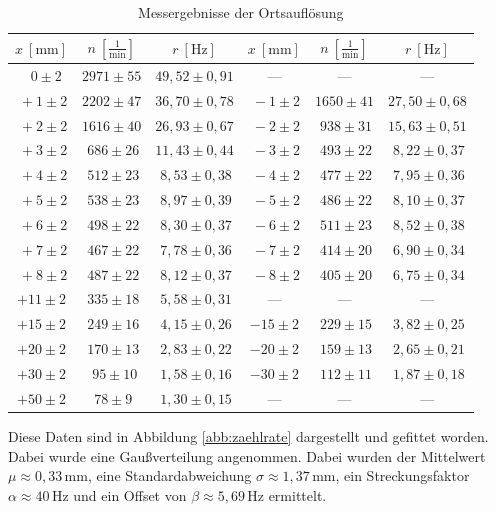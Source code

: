 \documentclass[12pt,a4paper]{scrartcl}
\numberwithin{equation}{section} %
\begin{document}
\begin{table}[h]
	\centering
	\begin{tabular}{c|c|c||c|c|c}
		$x\ [\mathrm{mm}]$ & $n\ [\frac{1}{\mathrm{min}}]$ & $r\ [\mathrm{Hz}]$ &
		$x\ [\mathrm{mm}]$ & $n\ [\frac{1}{\mathrm{min}}]$ & $r\ [\mathrm{Hz}]$ \vspace{1pt}\\
		\hline
		$\ \ \ 0 \pm 2$ & $2971 \pm 55$ & $49,52 \pm 0,91$ &---&---&--- \\
		$\ +1 \pm 2$ & $2202 \pm 47$ & $36,70 \pm 0,78$ &
		$\ -1 \pm 2$ & $1650 \pm 41$ & $27,50 \pm 0,68$ \\
		$\ +2 \pm 2$ & $1616 \pm 40$ & $26,93 \pm 0,67$ &
		$\ -2 \pm 2$ & $\ 938 \pm 31$ & $15,63 \pm 0,51$ \\
		$\ +3 \pm 2$ & $\ 686 \pm 26$ & $11,43 \pm 0,44$ &
		$\ -3 \pm 2$ & $\ 493 \pm 22$ & $\ 8,22 \pm 0,37$ \\
		$\ +4 \pm 2$ & $\ 512 \pm 23$ & $\ 8,53 \pm 0,38$ &
		$\ -4 \pm 2$ & $\ 477 \pm 22$ & $\ 7,95 \pm 0,36$ \\
		$\ +5 \pm 2$ & $\ 538 \pm 23$ & $\ 8,97 \pm 0,39$ &
		$\ -5 \pm 2$ & $\ 486 \pm 22$ & $\ 8,10 \pm 0,37$ \\
		$\ +6 \pm 2$ & $\ 498 \pm 22$ & $\ 8,30 \pm 0,37$ &
		$\ -6 \pm 2$ & $\ 511 \pm 23$ & $\ 8,52 \pm 0,38$ \\
		$\ +7 \pm 2$ & $\ 467 \pm 22$ & $\ 7,78 \pm 0,36$ &
		$\ -7 \pm 2$ & $\ 414 \pm 20$ & $\ 6,90 \pm 0,34$ \\
		$\ +8 \pm 2$ & $\ 487 \pm 22$ & $\ 8,12 \pm 0,37$ &
		$\ -8 \pm 2$ & $\ 405 \pm 20$ & $\ 6,75 \pm 0,34$ \\
		$+11 \pm 2$ & $\ 335 \pm 18$ & $\ 5,58 \pm 0,31$ &---&---&---\\
		$+15 \pm 2$ & $\ 249 \pm 16$ & $\ 4,15 \pm 0,26$ &
		$-15 \pm 2$ & $\ 229 \pm 15$ & $\ 3,82 \pm 0,25$ \\
		$+20 \pm 2$ & $\ 170 \pm 13$ & $\ 2,83 \pm 0,22$ &
		$-20 \pm 2$ & $\ 159 \pm 13$ & $\ 2,65 \pm 0,21$ \\
		$+30 \pm 2$ & $\ \ 95 \pm 10$ & $\ 1,58 \pm 0,16$ &
		$-30 \pm 2$ & $\ 112 \pm 11$ & $\ 1,87 \pm 0,18$ \\
		$+50 \pm 2$ & $\ 78 \pm 9$ & $\ 1,30 \pm 0,15$ &---&---&---
	\end{tabular}
	\caption{Messergebnisse der Ortsauflösung}
	\label{tab:Ortsauflösung}
\end{table}

\noindent
Diese Daten sind in Abbildung \ref{abb:zaehlrate} dargestellt und gefittet worden. Dabei wurde eine Gaußverteilung angenommen. Dabei wurden der Mittelwert $\mu\approx 0,33\,\mathrm{mm}$, eine Standardabweichung $\sigma\approx1,37\,\mathrm{mm}$, ein Streckungsfaktor $\alpha\approx 40\,\mathrm{Hz}$ und ein Offset von $\beta\approx 5,69\,\mathrm{Hz}$ ermittelt.
\end{document}
